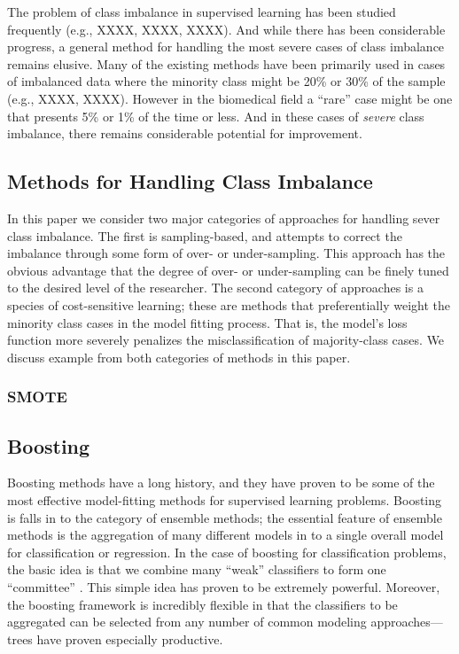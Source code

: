 \documentclass[10pt]{article}
\begin{document}
The problem of class imbalance in supervised learning has been studied frequently (e.g., XXXX, XXXX, XXXX). And while there has been considerable progress, a general method for handling the most severe cases of class imbalance remains elusive. Many of the existing methods have been primarily used in cases of imbalanced data where the minority class might be 20\% or 30\% of the sample (e.g., XXXX, XXXX). However in the biomedical field a ``rare'' case might be one that presents 5\% or 1\% of the time or less. And in these cases of \textit{severe} class imbalance, there remains considerable potential for improvement. 





\subsection{Methods for Handling Class Imbalance}
In this paper we consider two major categories of approaches for handling sever class imbalance. The first is sampling-based, and attempts to correct the imbalance through some form of over- or under-sampling. This approach has the obvious advantage that the degree of over- or under-sampling can be finely tuned to the desired level of the researcher. The second category of approaches is a species of cost-sensitive learning; these are methods that preferentially weight the minority class cases in the model fitting process. That is, the model's loss function more severely penalizes the misclassification of majority-class cases. We discuss example from both categories of methods in this paper.

\subsubsection{SMOTE}

\subsection{Boosting}
Boosting methods have a long history, and they have proven to be some of the most effective model-fitting methods for supervised learning problems. Boosting is falls in to the category of ensemble methods; the essential feature of ensemble methods is the aggregation of many different models in to a single overall model for classification or regression. In the case of boosting for classification problems, the basic idea is that we combine many ``weak'' classifiers to form one ``committee'' \cite{hastie09}. This simple idea has proven to be extremely powerful. Moreover, the boosting framework is incredibly flexible in that the classifiers to be aggregated can be selected from any number of common modeling approaches---trees have proven especially productive.
\end{document}
